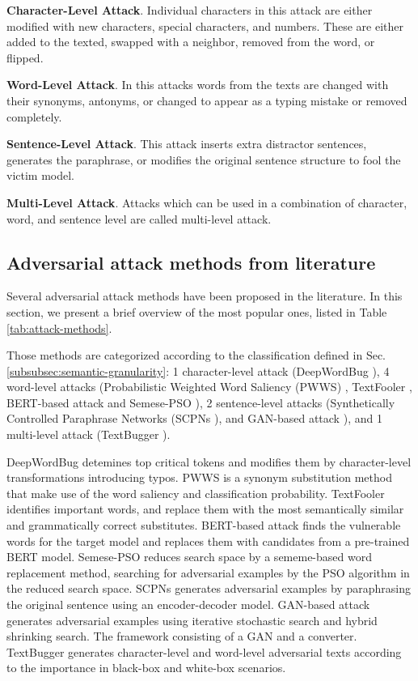 \textbf{Character-Level Attack}. Individual characters in this attack are either modified with new characters, special characters, and numbers. These are either added to the texted, swapped with a neighbor, removed from the word, or flipped.

\textbf{Word-Level Attack}. In this attacks words from the texts are changed with their synonyms, antonyms, or changed to appear as a typing mistake or removed completely.

\textbf{Sentence-Level Attack}. This attack inserts extra distractor sentences, generates the paraphrase, or modifies the original sentence structure to fool the victim model.

\textbf{Multi-Level Attack}. Attacks which can be used in a combination of character, word, and sentence level are called multi-level attack.

\subsection{Adversarial attack methods from literature}\label{subsec:aam-from-literature}

Several adversarial attack methods have been proposed in the literature. In this section, we present a brief overview of the most popular ones, listed in Table \ref{tab:attack-methods}.

Those methods are categorized according to the classification defined in Sec. \ref{subsubsec:semantic-granularity}:
1 character-level attack (DeepWordBug \cite{journals/corr/abs-1801-04354}), 4 word-level attacks (Probabilistic Weighted Word Saliency (PWWS) \cite{conf/acl/RenDHC19}, TextFooler \cite{journals/corr/abs-1907-11932}, BERT-based attack \cite{conf/emnlp/LiMGXQ20} and Semese-PSO \cite{conf/acl/ZangQYLZLS20}), 2 sentence-level attacks (Synthetically Controlled Paraphrase Networks (SCPNs \cite{conf/naacl/IyyerWGZ18}), and GAN-based attack \cite{journals/corr/abs-1710-11342}), and 1 multi-level attack (TextBugger \cite{conf/ndss/LiJDLW19}).

DeepWordBug detemines top critical tokens and modifies them by character-level transformations introducing typos. 
PWWS is a synonym substitution method that make use of the word saliency and classification probability.
TextFooler identifies important words, and replace them with the most semantically similar and grammatically correct substitutes.
BERT-based attack finds the vulnerable words for the target model and replaces them with candidates from a pre-trained BERT model.
Semese-PSO reduces search space by a sememe-based word replacement method, searching for adversarial examples by the PSO algorithm in the reduced search space.
SCPNs generates adversarial examples by paraphrasing the original sentence using an encoder-decoder model.
GAN-based attack generates adversarial examples using iterative stochastic search and hybrid shrinking search. The framework consisting of a GAN and a converter.
TextBugger generates character-level and word-level adversarial texts according to the importance in black-box and white-box scenarios.



